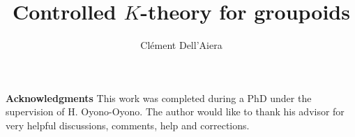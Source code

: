\documentclass[a4paper,10pt]{article}
\title{Controlled $K$-theory for groupoids}
\date{}
\author{ Clément Dell'Aiera}
\begin{document}
\maketitle
\tableofcontents
\vspace{0.5 cm}
\textbf{Acknowledgments} This work was completed during a PhD under the supervision of H. Oyono-Oyono. The author would like to thank his advisor for very helpful discussions, comments, help and corrections.









 
\end{document}
